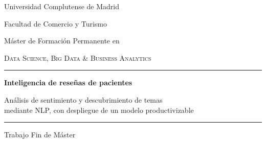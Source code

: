 \documentclass[11pt,a4paper]{article}
\begin{document}
\renewcommand{\figurename}{Figura}
\renewcommand{\tablename}{Tabla}
\renewcommand{\refname}{Referencias}
\renewcommand{\contentsname}{Índice}
\renewcommand{\appendixname}{Anexo}

\begin{titlepage}
\thispagestyle{empty}
\centering

\vspace*{1.5cm}

{\large Universidad Complutense de Madrid\par}
\vspace{0.35cm}
{\large Facultad de Comercio y Turismo\par}

\vspace{1.8cm}

{\normalsize Máster de Formación Permanente en\par}
\vspace{0.3cm}
{\large\scshape Data Science, Big Data \& Business Analytics\par}

\vspace{3.2cm}

\rule{\textwidth}{0.4pt}
\vspace{0.7cm}

{\LARGE\bfseries Inteligencia de reseñas de pacientes\par}

\vspace{0.7cm}

{\large Análisis de sentimiento y descubrimiento de temas\\
mediante NLP, con despliegue de un modelo productivizable\par}

\vspace{0.7cm}
\rule{\textwidth}{0.4pt}

\vspace{2.2cm}

{\large Trabajo Fin de Máster\par}


\end{titlepage}
\end{document}

